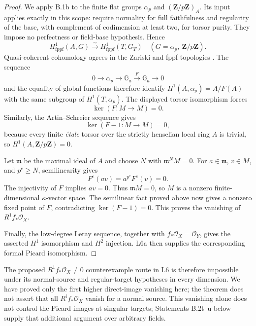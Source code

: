 \begin{proof}
We apply B.1b to the finite flat groups $\alpha_p$ and
$(\mathbf Z/p\mathbf Z)_A$.  Its input applies exactly in this
scope: \cite[Proposition 3, p.~432, and Theorem 6,
pp.~433--434]{Marrama2026} require normality for full faithfulness
and regularity of the base, with complement of codimension at
least two, for torsor purity.  They impose no perfectness or
field-base hypothesis.  Hence
\[
 H^1_{\mathrm{fppf}}(A,G)
       \xrightarrow{\ \sim\ } H^1_{\mathrm{fppf}}(T,G_T)
       \quad(G=\alpha_p,\ \mathbf Z/p\mathbf Z).
\]
Quasi-coherent cohomology agrees in the Zariski and fppf
topologies \cite[Proposition 35.9.3, Tag 03DW]{StacksB}.
The sequence
\[
 0\longrightarrow\alpha_p\longrightarrow\mathbb G_a
       \xrightarrow{F}\mathbb G_a\longrightarrow0
\]
and the equality of global functions therefore identify
$H^1(A,\alpha_p)=A/F(A)$ with the same subgroup of
$H^1(T,\alpha_p)$.  The displayed torsor isomorphism forces
\[
                         \ker(F:M\to M)=0.
\]
Similarly, the Artin--Schreier sequence gives
\[
                      \ker(F-1:M\to M)=0,
\]
because every finite \emph{\'etale} torsor over the strictly
henselian local ring $A$ is trivial, so $H^1(A,\mathbf Z/p\mathbf Z)=0$.

Let $\mathfrak m$ be the maximal ideal of $A$ and choose $N$
with $\mathfrak m^N M=0$.  For $a\in\mathfrak m$, $v\in M$,
and $p^e\ge N$, semilinearity gives
\[
                    F^e(av)=a^{p^e}F^e(v)=0.
\]
The injectivity of $F$ implies $av=0$.  Thus $\mathfrak mM=0$,
so $M$ is a nonzero finite-dimensional $\kappa$-vector space.
The semilinear fact proved above now gives a nonzero fixed
point of $F$, contradicting $\ker(F-1)=0$.  This proves the
vanishing of $R^1f_*\mathcal O_X$.

Finally, the low-degree Leray sequence, together with
$f_*\mathcal O_X=\mathcal O_Y$, gives the asserted
$H^1$ isomorphism and $H^2$ injection.  L6a then supplies
the corresponding formal Picard isomorphism.
\end{proof}

\begin{remark}
The proposed $R^1f_*\mathcal O_X\ne0$ counterexample route in
L6 is therefore impossible under its normal-source and
regular-target hypotheses in every dimension.  We have proved
only the first higher direct-image vanishing here; the theorem
does not assert that all $R^if_*\mathcal O_X$ vanish for a
normal source.  This vanishing alone does not control the
Picard images at singular targets; Statements B.2t--u below
supply that additional argument over arbitrary fields.
\end{remark}



